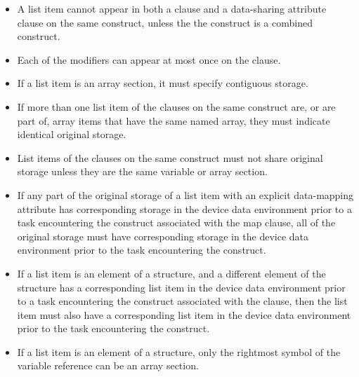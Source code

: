 \restrictions
\begin{itemize}

\item A list item cannot appear in both a  clause and a data-sharing
    attribute clause on the same construct, unless the the construct is a
    combined construct.

\item Each of the  modifiers can appear at most once on the
    clause.


\item If a list item is an array section, it must specify contiguous storage.

\item If more than one list item of the  clauses on the same construct
are, or are part of, array items that have the same named array, they must indicate
identical original storage.

\item List items of the  clauses on the same construct must not share
original storage unless they are the same variable or array section.

\item If any part of the original storage of a list item with an
explicit data-mapping attribute has corresponding storage in the device data
environment prior to a task encountering the construct associated with the map
clause, all of the original storage must have corresponding storage
in the device data environment prior to the task encountering the construct.

\item If a list item is an element of a structure, and a different element
of the structure has a corresponding list item in the device data environment
prior to a task encountering the construct associated with the 
clause, then the list item must also have a corresponding list item in the
device data environment prior to the task encountering the construct.

\item If a list item is an element of a structure, only the rightmost symbol of the variable reference can be an array section.


\end{itemize}
